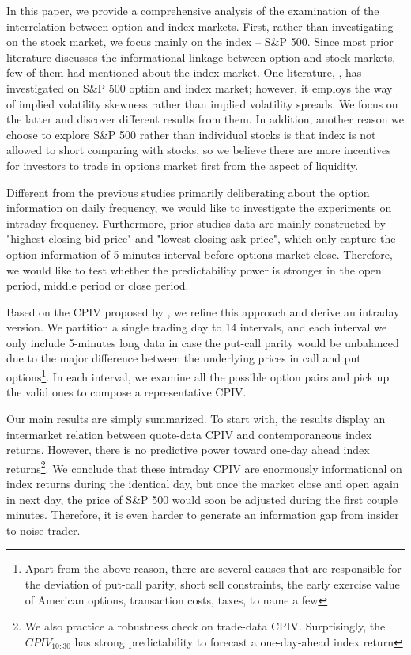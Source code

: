 In this paper, we provide a comprehensive analysis of the examination of the interrelation between option and index markets. First, rather than investigating on the stock market, we focus mainly on the index -- S\&P 500. Since most prior literature discusses the informational linkage between option and stock markets, few of them had mentioned about the index market. One literature, \textcite{atilgan2015implied},  has investigated on S\&P 500 option and index market; however, it employs the way of implied volatility skewness rather than implied volatility spreads. We focus on the latter and discover different results from them. In addition, another reason we choose to explore S\&P 500 rather than individual stocks is that index is not allowed to short comparing with stocks, so we believe there are more incentives for investors to trade in options market first from the aspect of liquidity.

Different from the previous studies primarily deliberating about the option information on daily frequency, we would like to investigate the experiments on intraday frequency. Furthermore, prior studies data are mainly constructed by "highest closing bid price" and "lowest closing ask price", which only capture the option information of 5-minutes interval before options market close. Therefore, we would like to test whether the predictability power is stronger in the open period, middle period or close period.
         
Based on the CPIV proposed by \textcite{cremers2010deviations}, we refine this approach and derive an intraday version. We partition a single trading day to 14 intervals, and each interval we only include 5-minutes long data in case the put-call parity would be unbalanced due to the major difference between the underlying prices in call and put options\footnote{Apart from the above reason, there are several causes that are responsible for the deviation of put-call parity, short sell constraints, the early exercise value of American options, transaction costs, taxes, to name a few}. In each interval, we examine all the possible option pairs and pick up the valid ones to compose a representative CPIV.

Our main results are simply summarized. To start with, the results display an intermarket relation between quote-data CPIV and contemporaneous index returns. However, there is no predictive power toward one-day ahead index returns\footnote{We also practice a robustness check on trade-data CPIV. Surprisingly, the $CPIV_{10:30}$ has strong predictability to forecast a one-day-ahead index return}. We conclude that these intraday CPIV are enormously informational on index returns during the identical day, but once the market close and open again in next day, the price of S\&P 500 would soon be adjusted during the first couple minutes. Therefore, it is even harder to generate an information gap from insider to noise trader.  

